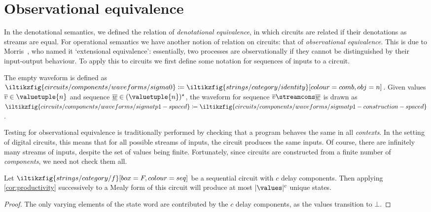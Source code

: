 \section{Observational equivalence}

In the denotational semantics, we defined the relation of
\emph{denotational equivalence}, in which circuits are related if their
denotations as streams are equal.
For operational semantics we have another notion of relation on circuits: that
of \emph{observational equivalence}.
This is due to Morris~\cite{morris1969lambdacalculus}, who named it
`extensional equivalence': essentially, two processes are observationally if they
cannot be distinguished by their input-output behaviour.
To apply this to circuits we first define some notation for sequences of inputs
to a circuit.

\begin{notation}[Waveform]\label{def:waveform}
    The empty waveform is defined as \(
        \iltikzfig{circuits/components/waveforms/sigma0}
        \coloneqq
        \iltikzfig{strings/category/identity}[colour=comb,obj=n]
    \).
    Given values \(\overline{v} \in \valuetuple{n}\) and sequence \(
        \overline{\underline{w}} \in (\valuetuple{n})^\star
    \), the waveform for sequence \(
        \overline{v} \streamcons \overline{\underline{w}}
    \) is drawn as \(
        \iltikzfig{circuits/components/waveforms/sigmatp1-spaced}
        \coloneqq
        \iltikzfig{circuits/components/waveforms/sigmatp1-construction-spaced}
    \).
\end{notation}

Testing for observational equivalence is traditionally performed by checking
that a program behaves the same in all \emph{contexts}.
In the setting of digital circuits, this means that for all possible streams of
inputs, the circuit produces the same inputs.
Of course, there are infinitely many streams of inputs, despite the set of
values being finite.
Fortunately, since circuits are constructed from a finite number of
\emph{components}, we need not check them all.

\begin{lemma}\label{lem:number-of-states}
    Let \(
        \iltikzfig{strings/category/f}[box=F,colour=seq]
    \) be a sequential circuit with \(c\) delay components.
    Then applying \cref{cor:productivity} successively to a Mealy form of this
    circuit will produce at most \(|\values|^c\) unique states.
\end{lemma}
\begin{proof}
    The only varying elements of the state word are contributed by
    the \(c\) delay components, as the values transition to \(\bot\).
\end{proof}

